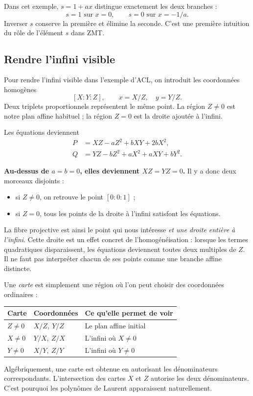 \documentclass[11pt,a4paper]{article}
\begin{document}
Dans cet exemple, $s=1+ax$ distingue exactement les deux branches :
\[
 s=1\text{ sur }x=0,\qquad s=0\text{ sur }x=-1/a.
\]
Inverser $s$ conserve la première et élimine la seconde. C'est une
première intuition du rôle de l'élément $s$ dans ZMT.

\subsection*{Rendre l'infini visible}

Pour rendre l'infini visible dans l'exemple d'ACL, on introduit les
coordonnées homogènes
\[
 [X:Y:Z],\qquad x=X/Z,\quad y=Y/Z.
\]
Deux triplets proportionnels représentent le même point. La région
$Z\neq0$ est notre plan affine habituel ; la région $Z=0$ est la droite
ajoutée à l'infini.

Les équations deviennent
\[
\begin{aligned}
 P&=XZ-aZ^2+bXY+2bX^2,\\
 Q&=YZ-bZ^2+aX^2+aXY+bY^2.
\end{aligned}
\]

\textbf{Au-dessus de $a=b=0$, elles deviennent $XZ=YZ=0$.}
Il y a donc deux morceaux disjoints :
\begin{itemize}
 \item si $Z\neq0$, on retrouve le point $[0:0:1]$ ;
 \item si $Z=0$, tous les points de la droite à l'infini satisfont les
 équations.
\end{itemize}
La fibre projective est ainsi le point qui nous intéresse \emph{et une
droite entière à l'infini}. Cette droite est un effet concret de
l'homogénéisation : lorsque les termes quadratiques disparaissent, les
équations deviennent toutes deux multiples de $Z$. Il ne faut pas
interpréter chacun de ses points comme une branche affine distincte.

Une \emph{carte} est simplement une région où l'on peut choisir des
coordonnées ordinaires :
\begin{center}
\renewcommand{\arraystretch}{1.3}
\begin{tabular}{lll}
\hline
Carte & Coordonnées & Ce qu'elle permet de voir\\
\hline
$Z\neq0$ & $X/Z,\ Y/Z$ & Le plan affine initial\\
$X\neq0$ & $Y/X,\ Z/X$ & L'infini où $X\neq0$\\
$Y\neq0$ & $X/Y,\ Z/Y$ & L'infini où $Y\neq0$\\
\hline
\end{tabular}
\end{center}
Algébriquement, une carte est obtenue en autorisant les dénominateurs
correspondants. L'intersection des cartes $X$ et $Z$ autorise les deux
dénominateurs. C'est pourquoi les polynômes de Laurent apparaissent
naturellement.
\end{document}
